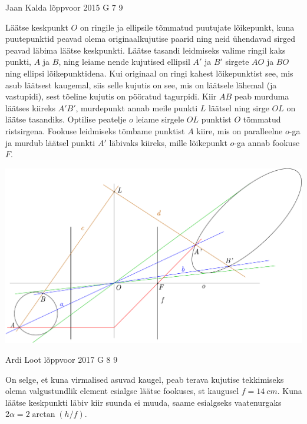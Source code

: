 \documentclass[11pt, twoside]{article}
\begin{document}
{%
{Jaan Kalda} %
{lõppvoor} %
{2015} %
{G 7} %
{9} %
{

\ifSolution
Läätse keskpunkt $O$ on ringile ja ellipsile tõmmatud puutujate lõikepunkt, kuna puutepunktid peavad olema originaalkujutise paarid ning neid ühendavad sirged peavad läbima läätse keskpunkti. Läätse tasandi leidmiseks valime ringil kaks punkti, $A$ ja $B$, ning leiame nende kujutised ellipsil $A'$ ja $B'$ sirgete $AO$ ja $BO$ ning ellipsi lõikepunktidena. Kui originaal on ringi kahest lõikepunktist see, mis asub läätsest kaugemal, siis selle kujutis on see, mis on läätsele lähemal (ja vastupidi), sest tõeline kujutis on pööratud tagurpidi. Kiir $AB$ peab murduma läätses kiireks $A'B'$, murdepunkt annab meile punkti $L$ läätsel ning sirge $OL$ on läätse tasandiks. Optilise peatelje $o$ leiame sirgele $OL$ punktist $O$ tõmmatud ristsirgena. Fookuse leidmiseks tõmbame punktist $A$ kiire, mis on paralleelne $o$-ga ja murdub läätsel punkti $A'$ läbivaks kiireks, mille lõikepunkt $o$-ga annab fookuse $F$.

\begin{center}
\includegraphics[width=\textwidth]{2015-v3g-07-ellips_lah}
\end{center}
\fi
}

{Ardi Loot} %
{lõppvoor} %
{2017} %
{G 8} %
{9} %
{

\ifSolution
On selge, et kuna virmalised asuvad kaugel, peab terava kujutise
tekkimiseks olema valgustundlik element esialgse läätse fookuses,
st kaugusel $f=\SI{14}{cm}.$ Kuna läätse keskpunkti läbiv kiir suunda
ei muuda, saame esialgseks vaatenurgaks $2\alpha=2\arctan\left(h/f\right).$

}}
\end{document}
